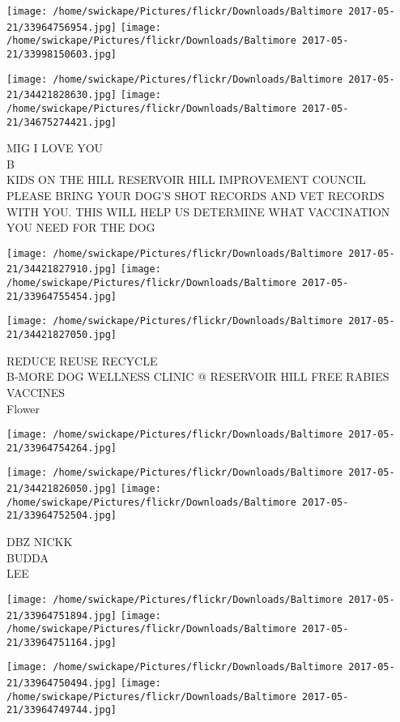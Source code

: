 \documentclass[10pt,letterpaper]{article}
\begin{document}
\texttt{[image: /home/swickape/Pictures/flickr/Downloads/Baltimore 2017-05-21/33964756954.jpg]}
\texttt{[image: /home/swickape/Pictures/flickr/Downloads/Baltimore 2017-05-21/33998150603.jpg]}

\texttt{[image: /home/swickape/Pictures/flickr/Downloads/Baltimore 2017-05-21/34421828630.jpg]}
\texttt{[image: /home/swickape/Pictures/flickr/Downloads/Baltimore 2017-05-21/34675274421.jpg]}

MIG I LOVE YOU\\
B\\
KIDS ON THE HILL RESERVOIR HILL IMPROVEMENT COUNCIL\\
PLEASE BRING YOUR DOG'S SHOT RECORDS AND VET RECORDS WITH YOU.  THIS WILL HELP US DETERMINE WHAT VACCINATION YOU NEED FOR THE DOG\\
\pagebreak

\texttt{[image: /home/swickape/Pictures/flickr/Downloads/Baltimore 2017-05-21/34421827910.jpg]}
\texttt{[image: /home/swickape/Pictures/flickr/Downloads/Baltimore 2017-05-21/33964755454.jpg]}

\texttt{[image: /home/swickape/Pictures/flickr/Downloads/Baltimore 2017-05-21/34421827050.jpg]}

REDUCE REUSE RECYCLE\\
B{-}MORE DOG WELLNESS CLINIC @ RESERVOIR HILL FREE RABIES VACCINES\\
Flower\\
\pagebreak

\texttt{[image: /home/swickape/Pictures/flickr/Downloads/Baltimore 2017-05-21/33964754264.jpg]}

\vspace{0.25in}
\texttt{[image: /home/swickape/Pictures/flickr/Downloads/Baltimore 2017-05-21/34421826050.jpg]}
\texttt{[image: /home/swickape/Pictures/flickr/Downloads/Baltimore 2017-05-21/33964752504.jpg]}

DBZ NICKK\\
BUDDA\\
LEE\\
\pagebreak

\texttt{[image: /home/swickape/Pictures/flickr/Downloads/Baltimore 2017-05-21/33964751894.jpg]}
\texttt{[image: /home/swickape/Pictures/flickr/Downloads/Baltimore 2017-05-21/33964751164.jpg]}

\texttt{[image: /home/swickape/Pictures/flickr/Downloads/Baltimore 2017-05-21/33964750494.jpg]}
\texttt{[image: /home/swickape/Pictures/flickr/Downloads/Baltimore 2017-05-21/33964749744.jpg]}
\end{document}
